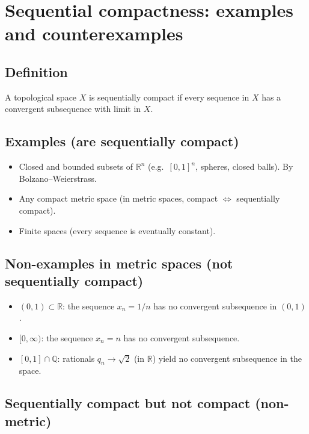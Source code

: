 \documentclass[12pt,a4paper]{article}
\theoremstyle{plain}
\theoremstyle{definition}
\theoremstyle{remark}
\theoremstyle{remark}
\begin{document}
\section*{Sequential compactness: examples and counterexamples}

\subsection*{Definition}
A topological space \(X\) is sequentially compact if every sequence in \(X\) has a convergent subsequence with limit in \(X\).

\bigskip

\subsection*{Examples (are sequentially compact)}

\begin{itemize}
\item Closed and bounded subsets of \(\mathbb{R}^n\) (e.g.\ \([0,1]^n\), spheres, closed balls). By Bolzano--Weierstrass.
\item Any compact metric space (in metric spaces, compact \(\Leftrightarrow\) sequentially compact).
\item Finite spaces (every sequence is eventually constant).
\end{itemize}

\medskip

\subsection*{Non-examples in metric spaces (not sequentially compact)}

\begin{itemize}
\item \((0,1)\subset\mathbb{R}\): the sequence \(x_n=1/n\) has no convergent subsequence in \((0,1)\).
\item \([0,\infty)\): the sequence \(x_n=n\) has no convergent subsequence.
\item \([0,1]\cap\mathbb{Q}\): rationals \(q_n\to\sqrt{2}\) (in \(\mathbb{R}\)) yield no convergent subsequence in the space.
\end{itemize}

\medskip

\subsection*{Sequentially compact but not compact (non-metric)}
\end{document}
